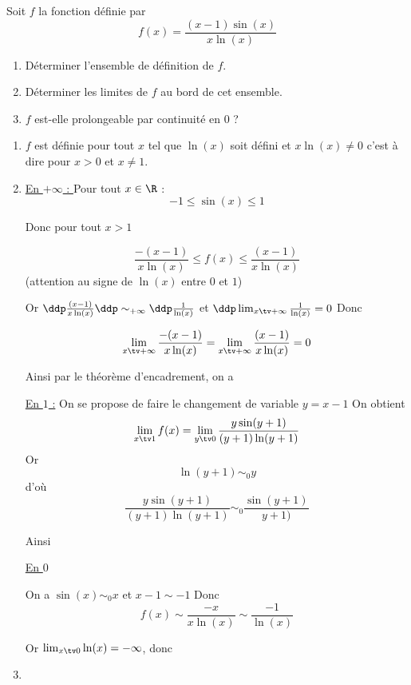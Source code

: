 \documentclass[a4paper, 11pt,reqno]{article}
\begin{document}
\begin{exercice}
Soit $f$ la fonction définie par 
$$f(x) = \frac{(x-1) \sin(x)}{x\ln(x)}$$
\begin{enumerate}
\item Déterminer l'ensemble de définition de $f$. 
\item Déterminer les limites de $f$ au bord de cet ensemble. 
\item $f$ est-elle prolongeable par continuité en $0$ ? 
\end{enumerate}
\end{exercice}

\begin{correction}
\begin{enumerate}
\item $f$ est définie pour tout $x$ tel que $\ln(x)$ soit défini et $x\ln(x) \neq 0$ c'est à dire pour $x>0$ et $x\neq 1$. 

\conclusion{ $D_f = ]0,1[\cup ]1,+\infty[$}

\item 
\underline{ En $+\infty$ : } Pour tout $x\in \R$ :
$$-1 \leq \sin(x) \leq 1$$

Donc pour tout $x>1$ 

$$ \frac{-(x-1)}{x\ln(x)} \leq f(x) \leq \frac{(x-1)}{x\ln(x)}$$
(attention au signe de $\ln(x)$ entre $0 $ et $1$)

Or $\ddp  \frac{(x-1)}{x\ln(x)} \ddp  \sim_{+\infty} \ddp \frac{1}{\ln(x)}$
et $\ddp \lim_{x\tv +\infty } \frac{1}{\ln(x)} = 0$
Donc

$$\lim_{x\tv +\infty } \frac{-(x-1)}{x\ln(x)} = \lim_{x\tv +\infty } \frac{(x-1)}{x\ln(x)}= 0$$

Ainsi par le théorème d'encadrement, on a 

\underline{En $1$ :} On se propose de faire le changement de variable $y =x-1$ 
On obtient 
$$\lim_{x\tv 1} f(x) =\lim_{y\tv 0} \frac{y \sin(y+1)}{(y+1) \ln(y+1)}$$
Or 
$$\ln(y+1)\sim_0 y $$
d'où
$$\frac{y \sin(y+1)}{(y+1) \ln(y+1)} \sim_0  \frac{\sin(y+1)}{y+1)}$$

Ainsi 



\underline{En $0$}

On a 
$\sin(x) \sim_0 x$ et $x-1\sim -1$
Donc 
$$f(x) \sim \frac{-x}{x\ln(x)}\sim \frac{-1}{\ln(x)}$$

Or $\lim_{x\tv 0} \ln(x) = -\infty$, donc 

\item 
{}



\end{enumerate}
\end{correction}
\end{document}
